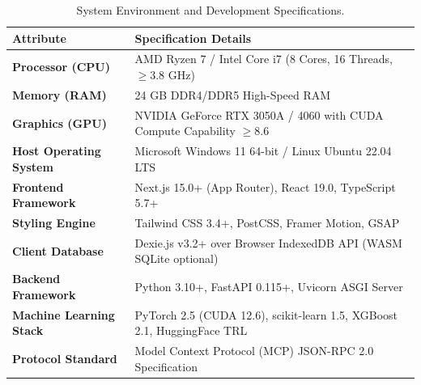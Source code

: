 \documentclass[12pt,a4paper]{report}
\begin{document}
\begin{table}[H]
\centering
\caption{System Environment and Development Specifications.}
\label{tab:system_specs}
\small
\begin{tabularx}{\textwidth}{lX}
\toprule
\textbf{Attribute} & \textbf{Specification Details} \\
\midrule
\textbf{Processor (CPU)} & AMD Ryzen 7 / Intel Core i7 (8 Cores, 16 Threads, $\ge 3.8$ GHz) \\
\textbf{Memory (RAM)} & 24 GB DDR4/DDR5 High-Speed RAM \\
\textbf{Graphics (GPU)} & NVIDIA GeForce RTX 3050A / 4060 with CUDA Compute Capability $\ge 8.6$ \\
\textbf{Host Operating System} & Microsoft Windows 11 64-bit / Linux Ubuntu 22.04 LTS \\
\textbf{Frontend Framework} & Next.js 15.0+ (App Router), React 19.0, TypeScript 5.7+ \\
\textbf{Styling Engine} & Tailwind CSS 3.4+, PostCSS, Framer Motion, GSAP \\
\textbf{Client Database} & Dexie.js v3.2+ over Browser IndexedDB API (WASM SQLite optional) \\
\textbf{Backend Framework} & Python 3.10+, FastAPI 0.115+, Uvicorn ASGI Server \\
\textbf{Machine Learning Stack} & PyTorch 2.5 (CUDA 12.6), scikit-learn 1.5, XGBoost 2.1, HuggingFace TRL \\
\textbf{Protocol Standard} & Model Context Protocol (MCP) JSON-RPC 2.0 Specification \\
\bottomrule
\end{tabularx}
\end{table}
\end{document}
